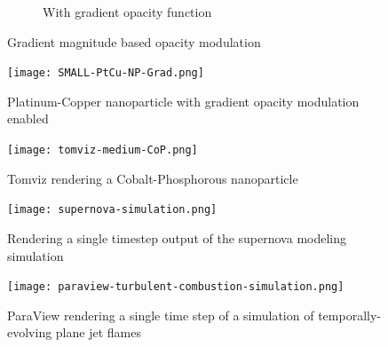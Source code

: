 \begin{figure}[ht]
\begin{subfigure}[b]{0.5\columnwidth}
    \caption{With gradient opacity function}
    \label{fig:Ng2}
  \end{subfigure}
  \caption{Gradient magnitude based opacity modulation}
  \label{fig:gradient}
\end{figure}

\begin{figure}[ht]
  \centering
  \texttt{[image: SMALL-PtCu-NP-Grad.png]}
  \caption{Platinum-Copper nanoparticle with gradient opacity modulation enabled}
  \label{fig:ptcu-grad}
\end{figure}

\begin{figure}[ht]
  \centering
  \texttt{[image: tomviz-medium-CoP.png]}
  \caption{Tomviz\protect\cite{marcus_hanwell_tomviz_2014} rendering a
  Cobalt-Phosphorous nanoparticle}
  \label{fig:tomviz-cop}
\end{figure}

\begin{figure}[ht]
  \centering
  \texttt{[image: supernova-simulation.png]}
  \caption{Rendering a single timestep output of the supernova modeling
  simulation}
  \label{fig:supernova}
\end{figure}

\begin{figure}[ht]
  \centering
  \texttt{[image: paraview-turbulent-combustion-simulation.png]}
  \caption{ParaView\protect\cite{ahrens_paraview:_2005, ayachit_paraview_2015,
  ayachit_paraview_2015-1} rendering a single time step of a simulation of
  temporally-evolving plane jet
  flames\protect\cite{hiroshi_akiba_visualizing_2007}}
  \label{fig:paraview-turbulent-combustion}
\end{figure}
